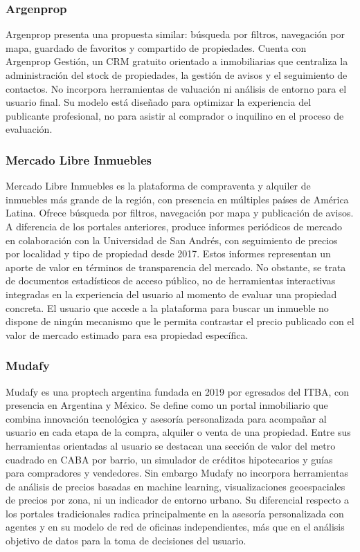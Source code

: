 \subsubsection{Argenprop}

Argenprop presenta una propuesta similar: búsqueda por filtros, navegación por mapa, guardado de favoritos y compartido de propiedades. Cuenta con Argenprop Gestión, un CRM gratuito orientado a inmobiliarias que centraliza la administración del stock de propiedades, la gestión de avisos y el seguimiento de contactos. No incorpora herramientas de valuación ni análisis de entorno para el usuario final. Su modelo está diseñado para optimizar la experiencia del publicante profesional, no para asistir al comprador o inquilino en el proceso de evaluación.

\subsubsection{Mercado Libre Inmuebles}

Mercado Libre Inmuebles es la plataforma de compraventa y alquiler de inmuebles más grande de la región, con presencia en múltiples países de América Latina. Ofrece búsqueda por filtros, navegación por mapa y publicación de avisos. A diferencia de los portales anteriores, produce informes periódicos de mercado en colaboración con la Universidad de San Andrés, con seguimiento de precios por localidad y tipo de propiedad desde 2017. Estos informes representan un aporte de valor en términos de transparencia del mercado. No obstante, se trata de documentos estadísticos de acceso público, no de herramientas interactivas integradas en la experiencia del usuario al momento de evaluar una propiedad concreta. El usuario que accede a la plataforma para buscar un inmueble no dispone de ningún mecanismo que le permita contrastar el precio publicado con el valor de mercado estimado para esa propiedad específica.

\subsubsection{Mudafy}

Mudafy es una proptech argentina fundada en 2019 por egresados del ITBA, con presencia en Argentina y México. Se define como un portal inmobiliario que combina innovación tecnológica y asesoría personalizada para acompañar al usuario en cada etapa de la compra, alquiler o venta de una propiedad. Entre sus herramientas orientadas al usuario se destacan una sección de valor del metro cuadrado en CABA por barrio, un simulador de créditos hipotecarios y guías para compradores y vendedores. Sin embargo Mudafy no incorpora herramientas de análisis de precios basadas en machine learning, visualizaciones geoespaciales de precios por zona, ni un indicador de entorno urbano. Su diferencial respecto a los portales tradicionales radica principalmente en la asesoría personalizada con agentes y en su modelo de red de oficinas independientes, más que en el análisis objetivo de datos para la toma de decisiones del usuario.

